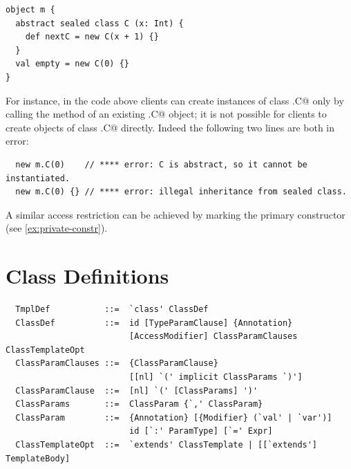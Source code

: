 \begin{lstlisting}
object m {
  abstract sealed class C (x: Int) {
    def nextC = new C(x + 1) {}
  }
  val empty = new C(0) {}
}
\end{lstlisting}
For instance, in the code above clients can create instances of class
\lstinline@m.C@ only by calling the  method of an existing \lstinline@m.C@
object; it is not possible for clients to create objects of class
\lstinline@m.C@ directly. Indeed the following two lines are both in error:

\begin{lstlisting}
  new m.C(0)    // **** error: C is abstract, so it cannot be instantiated.
  new m.C(0) {} // **** error: illegal inheritance from sealed class.
\end{lstlisting}

A similar access restriction can be achieved by marking the primary
constructor  (see \ref{ex:private-constr}).

\section{Class Definitions}
\label{sec:class-defs}

\syntax\begin{lstlisting} 
  TmplDef           ::=  `class' ClassDef 
  ClassDef          ::=  id [TypeParamClause] {Annotation} 
                         [AccessModifier] ClassParamClauses ClassTemplateOpt 
  ClassParamClauses ::=  {ClassParamClause} 
                         [[nl] `(' implicit ClassParams `)']
  ClassParamClause  ::=  [nl] `(' [ClassParams] ')'
  ClassParams       ::=  ClassParam {`,' ClassParam}
  ClassParam        ::=  {Annotation} [{Modifier} (`val' | `var')] 
                         id [`:' ParamType] [`=' Expr]
  ClassTemplateOpt  ::=  `extends' ClassTemplate | [[`extends'] TemplateBody]
\end{lstlisting}


